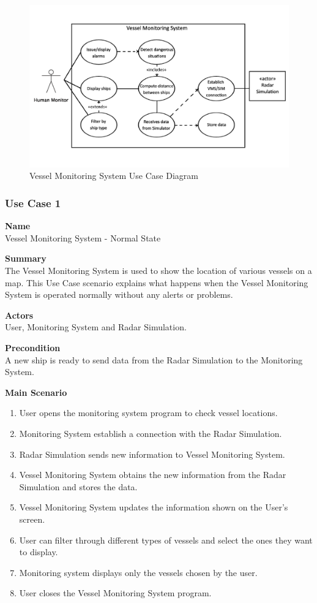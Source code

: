\begin{figure}[h]
\caption{Vessel Monitoring System Use Case Diagram}
\includegraphics[width=1.0\textwidth]{vmsdiagram.png}
\end{figure}

\subsubsection{Use Case 1} \label{uc:1}

\noindent
{\bf Name}\\
Vessel Monitoring System - Normal State

\noindent
{\bf Summary}\\
The Vessel Monitoring System is used to show the location of various vessels on a map. This Use Case scenario explains what happens when the Vessel Monitoring System is operated normally without any alerts or problems.

\noindent
{\bf Actors}\\
User, Monitoring System and Radar Simulation.

\noindent
{\bf Precondition}\\
A new ship is ready to send data from the Radar Simulation to the Monitoring System.

\noindent
{\bf Main Scenario}\\
\vspace*{-0.2in}
\begin{enumerate}
\item User opens the monitoring system program to check vessel locations.
\item Monitoring System establish a connection with the Radar Simulation.
\item Radar Simulation sends new information to Vessel Monitoring System.
\item Vessel Monitoring System obtains the new information from the Radar Simulation and stores the data.
\item Vessel Monitoring System updates the information shown on the User's screen.
\item User can filter through different types of vessels and select the ones they want to display.
\item Monitoring system displays only the vessels chosen by the user.
\item User closes the Vessel Monitoring System program.
\end{enumerate}

